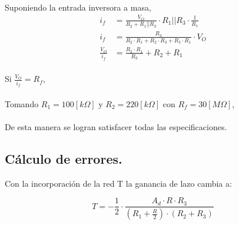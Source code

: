 \documentclass[11pt, a4paper]{article}
\begin{document}
\paragraph{}
Suponiendo la entrada inversora a masa,
\begin{align}
    \nonumber
    i_f &= \frac{V_O}{R_2 + R_1||R_3}\cdot R_1||R_3 \cdot \frac{1}{R_1} \\
    \nonumber
    i_f &= \frac{R_3}{R_2\cdot R_1 + R_2\cdot R_3 + R_3\cdot R_1} \cdot V_O \\
    \nonumber
    \frac{V_O}{i_f} &= \frac{R_2 \cdot R_1}{R_3} + R_2 + R_1
\end{align}

\paragraph{}
Si $\frac{V_O}{i_f}=R_f$,
\begin{center}
\end{center}

\paragraph{}
Tomando  $R_1 = 100[k\Omega]$ y $R_2 = 220[k\Omega]$ con $R_f=30[M\Omega]$,
\begin{center}
\end{center}

\paragraph{}
De esta manera se logran satisfacer todas las especificaciones.

\subsection{Cálculo de errores.}
\onehalfspacing
Con la incorporación de la red T la ganancia de lazo cambia a:

\begin{equation}
    \nonumber
    T = - \frac{1}{2}\cdot \frac{A_d \cdot R \cdot R_3}{\left( 
R_1 + \frac{R}{2} \right) \cdot \left( R_2 + R_3 \right)}
\end{equation}
\end{document}
